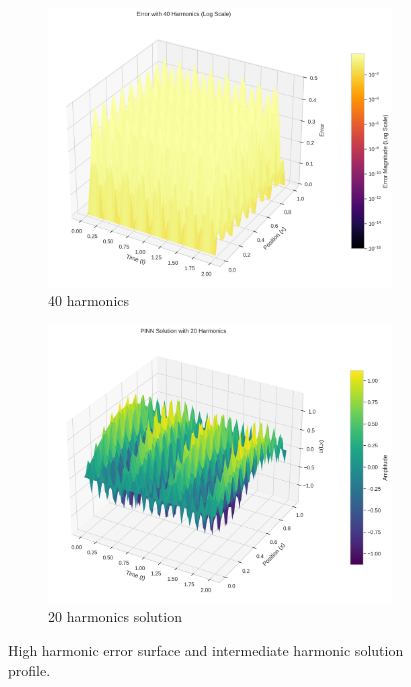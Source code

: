 \begin{figure}[H]
    \centering
    \begin{subfigure}[b]{0.48\textwidth}
        \centering
        \includegraphics[width=\textwidth]{figures/3d_comparison_error_40h.png}
        \caption{40 harmonics}
    \end{subfigure}
    \hfill
    \begin{subfigure}[b]{0.48\textwidth}
        \centering
        \includegraphics[width=\textwidth]{figures/3d_comparison_pinn_solution_20h.png}
        \caption{20 harmonics solution}
    \end{subfigure}
    \caption{High harmonic error surface and intermediate harmonic solution profile.}
    \label{fig:3d_high_error}
\end{figure}

